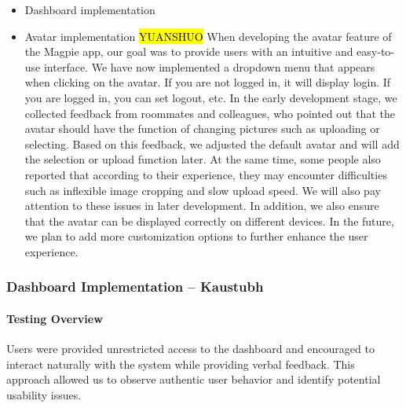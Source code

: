 \documentclass{report}
\begin{document}
\begin{itemize}
    \item Dashboard implementation \\
    \item Avatar implementation \hl{YUANSHUO}
    When developing the avatar feature of the Magpie app, our goal was to provide users with an intuitive and easy-to-use interface. We have now implemented a dropdown menu that appears when clicking on the avatar. If you are not logged in, it will display login. If you are logged in, you can set logout, etc. In the early development stage, we collected feedback from roommates and colleagues, who pointed out that the avatar should have the function of changing pictures such as uploading or selecting. Based on this feedback, we adjusted the default avatar and will add the selection or upload function later. At the same time, some people also reported that according to their experience, they may encounter difficulties such as inflexible image cropping and slow upload speed. We will also pay attention to these issues in later development. In addition, we also ensure that the avatar can be displayed correctly on different devices. In the future, we plan to add more customization options to further enhance the user experience.
\end{itemize}
\subsubsection{Dashboard Implementation -- Kaustubh}
\paragraph{Testing Overview}  
Users were provided unrestricted access to the dashboard and encouraged to interact naturally with the system while providing verbal feedback. This approach allowed us to observe authentic user behavior and identify potential usability issues.
\end{document}

